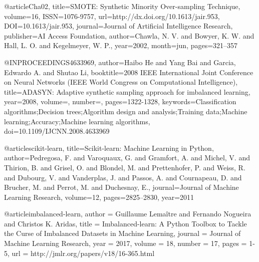   @article{Cha02,
  title={SMOTE: Synthetic Minority Over-sampling Technique},
  volume={16},
  ISSN={1076-9757},
  url={http://dx.doi.org/10.1613/jair.953},
  DOI={10.1613/jair.953},
  journal={Journal of Artificial Intelligence Research},
  publisher={AI Access Foundation},
  author={Chawla, N. V. and Bowyer, K. W. and Hall, L. O. and Kegelmeyer, W. P.},
  year={2002},
  month=jun, pages={321–357} }

  @INPROCEEDINGS{4633969,
  author={Haibo He and Yang Bai and Garcia, Edwardo A. and Shutao Li},
  booktitle={2008 IEEE International Joint Conference on Neural Networks (IEEE World Congress on Computational Intelligence)}, 
  title={ADASYN: Adaptive synthetic sampling approach for imbalanced learning}, 
  year={2008},
  volume={},
  number={},
  pages={1322-1328},
  keywords={Classification algorithms;Decision trees;Algorithm design and analysis;Training data;Machine learning;Accuracy;Machine learning algorithms},
  doi={10.1109/IJCNN.2008.4633969}}

  @article{scikit-learn,
  title={Scikit-learn: Machine Learning in {P}ython},
  author={Pedregosa, F. and Varoquaux, G. and Gramfort, A. and Michel, V.
          and Thirion, B. and Grisel, O. and Blondel, M. and Prettenhofer, P.
          and Weiss, R. and Dubourg, V. and Vanderplas, J. and Passos, A. and
          Cournapeau, D. and Brucher, M. and Perrot, M. and Duchesnay, E.},
  journal={Journal of Machine Learning Research},
  volume={12},
  pages={2825--2830},
  year={2011}
}

@article{imbalanced-learn,
author  = {Guillaume  Lema{{\^i}}tre and Fernando Nogueira and Christos K. Aridas},
title   = {Imbalanced-learn: A Python Toolbox to Tackle the Curse of Imbalanced Datasets in Machine Learning},
journal = {Journal of Machine Learning Research},
year    = {2017},
volume  = {18},
number  = {17},
pages   = {1-5},
url     = {http://jmlr.org/papers/v18/16-365.html}
}